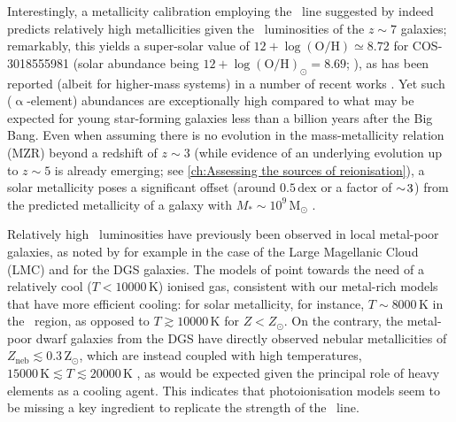 Interestingly, a metallicity calibration employing the \OIIILam\ line suggested by \citet{2020ApJ...903..150J} indeed predicts relatively high metallicities given the \OIIILam\ luminosities of the $z \sim 7$ galaxies; remarkably, this yields a super-solar value of $12 + \log \left ( \text{O/H} \right) \simeq 8.72$ for COS-3018555981 (solar abundance being $12 + \log \left ( \text{O/H} \right)_\odot = 8.69$; \citealt{2009ARA&A..47..481A}), as has been reported (albeit for higher-mass systems) in a number of recent works \citep[, and references therein]{2022ApJ...928..179L}. Yet such ($\upalpha$-element) abundances are exceptionally high compared to what may be expected for young star-forming galaxies less than a billion years after the Big Bang. Even when assuming there is no evolution in the mass-metallicity relation (MZR) beyond a redshift of $z \sim 3$ (while evidence of an underlying evolution up to $z \sim 5$ is already emerging; see \cref{ch:Assessing the sources of reionisation}), a solar metallicity poses a significant offset (around $0.5 \, \mathrm{dex}$ or a factor of $\sim \! 3$) from the predicted metallicity of a galaxy with $M_* \sim 10^9 \, \mathrm{M_\odot}$ \citep{2021ApJ...914...19S}.

Relatively high \OIIILam\ luminosities have previously been observed in local metal-poor galaxies, as noted by for example \citet{2012A&A...548A..91L} in the case of the Large Magellanic Cloud (LMC) and \citet{2015A&A...578A..53C, 2019A&A...626A..23C} for the DGS galaxies. The models of \citet{2012A&A...548A..91L} point towards the need of a relatively cool ($T < \num{10000} \, \mathrm{K}$) ionised gas, consistent with our metal-rich models that have more efficient cooling: for solar metallicity, for instance, $T \sim \num{8000} \, \mathrm{K}$ in the \HII\ region, as opposed to $T \gtrsim \num{10000} \, \mathrm{K}$ for $Z < Z_\odot$. On the contrary, the metal-poor dwarf galaxies from the DGS have directly observed nebular metallicities of $Z_\text{neb} \lesssim 0.3 \, \mathrm{Z_\odot}$, which are instead coupled with high temperatures, $\num{15000} \, \mathrm{K} \lesssim T \lesssim \num{20000} \, \mathrm{K}$ \citep[e.g.][]{1990Natur.343..238I, 1997ApJS..108....1I, 1998ApJ...500..188I, 2000ApJ...531..776G}, as would be expected given the principal role of heavy elements as a cooling agent. This indicates that photoionisation models seem to be missing a key ingredient to replicate the strength of the \OIIILam\ line.

